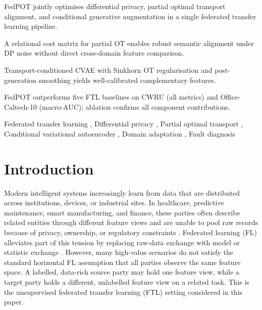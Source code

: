 \documentclass[a4paper,fleqn]{cas-sc}
\begin{document}
\begin{highlights}
\item FedPOT jointly optimises differential privacy, partial optimal
  transport alignment, and conditional generative augmentation in a
  single federated transfer learning pipeline.
\item A relational cost matrix for partial OT enables robust semantic
  alignment under DP noise without direct cross-domain feature comparison.
\item Transport-conditioned CVAE with Sinkhorn OT regularisation and
  post-generation smoothing yields well-calibrated complementary features.
\item FedPOT outperforms five FTL baselines on CWRU (all metrics) and
  Office-Caltech-10 (macro-AUC); ablation confirms all component contributions.
\end{highlights}

\begin{keywords}
Federated transfer learning \sep
Differential privacy \sep
Partial optimal transport \sep
Conditional variational autoencoder \sep
Domain adaptation \sep
Fault diagnosis
\end{keywords}

\maketitle


\section{Introduction}
\label{sec:intro}

Modern intelligent systems increasingly learn from data that are distributed
across institutions, devices, or industrial sites. In healthcare, predictive
maintenance, smart manufacturing, and finance, these parties often describe
related entities through different feature views and are unable to pool raw
records because of privacy, ownership, or regulatory constraints
\citep{Yang2019,Kairouz2021,Rieke2020}. Federated learning (FL) alleviates
part of this tension by replacing raw-data exchange with model or statistic
exchange \citep{McMahan2017,Li2020FedProx,Konecny2016}. However, many
high-value scenarios do not satisfy the standard horizontal FL assumption
that all parties observe the same feature space. A labelled, data-rich source
party may hold one feature view, while a target party holds a different,
unlabelled feature view on a related task. This is the unsupervised
federated transfer learning (FTL) setting considered in this paper.
\end{document}
